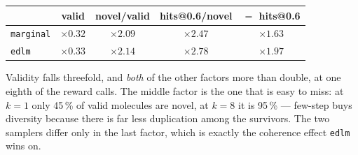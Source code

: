 \documentclass[11pt]{article}
\begin{document}
\begin{center}\small
\begin{tabular}{lcccc}
\toprule
 & valid & novel/valid & hits@0.6/novel & $=$ hits@0.6 \\
\midrule
\texttt{marginal} & $\times 0.32$ & $\times 2.09$ & $\times 2.47$ & $\times 1.63$ \\
\texttt{edlm}     & $\times 0.33$ & $\times 2.14$ & $\times 2.78$ & $\times 1.97$ \\
\bottomrule
\end{tabular}
\end{center}

Validity falls threefold, and \emph{both} of the other factors more than double,
at one eighth of the reward calls. The middle factor is the one that is easy to
miss: at $k=1$ only 45\,\% of valid molecules are novel, at $k=8$ it is 95\,\% ---
few-step buys diversity because there is far less duplication among the
survivors. The two samplers differ only in the last factor, which is exactly the
coherence effect \texttt{edlm} wins on.
\end{document}

